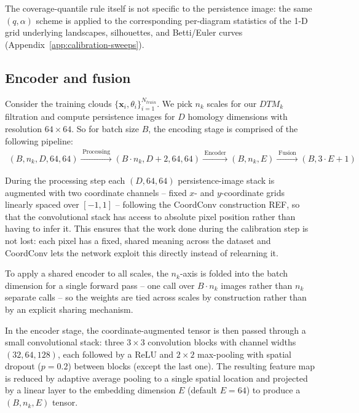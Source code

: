 \documentclass[11pt,letterpaper]{article}
\newcommand{\1}{\mathds{1}}
\newcommand{\pc}{\mathbf{x}}
\theoremstyle{plain}
\theoremstyle{definitioncolon}
\begin{document}
The coverage-quantile rule itself is not specific to the persistence image: the
same $(q,\alpha)$ scheme is applied to the corresponding per-diagram statistics of
the 1-D grid underlying landscapes, silhouettes, and Betti/Euler curves 
(Appendix~\ref{app:calibration-sweeps}).

\subsection{Encoder and fusion}
\label{ssec:encoder-fusion}

Consider the training clouds $\{\pc_i, \theta_i\}_{i=1}^{N_{train}}$. We pick $n_k$
scales for our $DTM_k$ filtration and compute persistence
images for $D$ homology dimensions with resolution $64 \times 64$.
So for batch size $B$, the encoding stage is comprised of the following
pipeline:
    \begin{align*}
    (B, n_k, D, 64, 64) \xrightarrow{\;\text{Processing}\;} (B\!\cdot\!n_k,D{+}2,64,64) \xrightarrow{\;\text{Encoder}\;} (B,n_k,E) \xrightarrow{\;\text{Fusion}\;} (B,3\!\cdot\!E+1)
    \end{align*}

During the processing step each $(D, 64, 64)$ persistence-image
stack is augmented with two coordinate channels -- fixed $x$- and
$y$-coordinate grids linearly spaced over $[-1, 1]$ -- following the CoordConv
construction REF, so that the convolutional stack has access
to absolute pixel position rather than having to infer it. This ensures that the work
done during the calibration step is not lost: each pixel has a fixed,
shared meaning across the dataset and CoordConv lets the network exploit this
directly instead of relearning it.

To apply a shared encoder to all scales, the $n_k$-axis is folded into the
batch dimension for a single forward pass -- one call over $B \cdot n_k$ images
rather than $n_k$ separate calls -- so the weights are tied across scales by
construction rather than by an explicit sharing mechanism.

In the encoder stage, the coordinate-augmented tensor is then passed through a small
convolutional stack: three $3\times3$ convolution blocks with channel widths
$(32, 64, 128)$, each followed by a ReLU and $2\times2$ max-pooling with
spatial dropout ($p=0.2$) between blocks (except the last one). The resulting
feature map is reduced by adaptive average pooling to a single spatial location
and projected by a linear layer to the embedding dimension $E$ (default $E=64$)
to produce a $(B, n_k, E)$ tensor.
\end{document}
